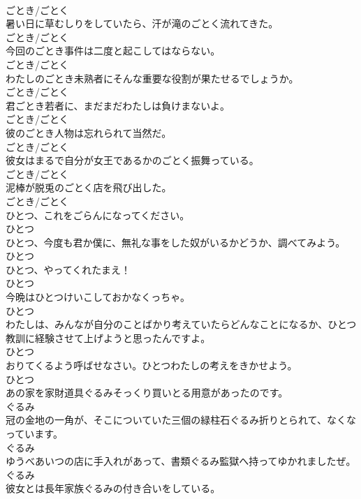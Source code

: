 \documentclass[8pt]{extreport}
\begin{document}
\begin{CJK}{UTF8}{min}
\\	ごとき/ごとく	
\\	暑い日に草むしりをしていたら、汗が滝のごとく流れてきた。	
\\	ごとき/ごとく	
\\	今回のごとき事件は二度と起こしてはならない。	
\\	ごとき/ごとく	
\\	わたしのごとき未熟者にそんな重要な役割が果たせるでしょうか。	
\\	ごとき/ごとく	
\\	君ごとき若者に、まだまだわたしは負けまないよ。	
\\	ごとき/ごとく	
\\	彼のごとき人物は忘れられて当然だ。	
\\	ごとき/ごとく	
\\	彼女はまるで自分が女王であるかのごとく振舞っている。	
\\	ごとき/ごとく	
\\	泥棒が脱兎のごとく店を飛び出した。	
\\	ごとき/ごとく	
\\	ひとつ、これをごらんになってください。	
\\	ひとつ	
\\	ひとつ、今度も君か僕に、無礼な事をした奴がいるかどうか、調べてみよう。	
\\	ひとつ	
\\	ひとつ、やってくれたまえ！	
\\	ひとつ	
\\	今晩はひとつけいこしておかなくっちゃ。	
\\	ひとつ	
\\	わたしは、みんなが自分のことばかり考えていたらどんなことになるか、ひとつ教訓に経験させて上げようと思ったんですよ。	
\\	ひとつ	
\\	おりてくるよう呼ばせなさい。ひとつわたしの考えをきかせよう。	
\\	ひとつ	
\\	あの家を家財道具ぐるみそっくり買いとる用意があったのです。	
\\	ぐるみ	
\\	冠の金地の一角が、そこについていた三個の緑柱石ぐるみ折りとられて、なくなっています。	
\\	ぐるみ	
\\	ゆうべあいつの店に手入れがあって、書類ぐるみ監獄へ持ってゆかれましたぜ。	
\\	ぐるみ	
\\	彼女とは長年家族ぐるみの付き合いをしている。	

\end{CJK}
\end{document}
